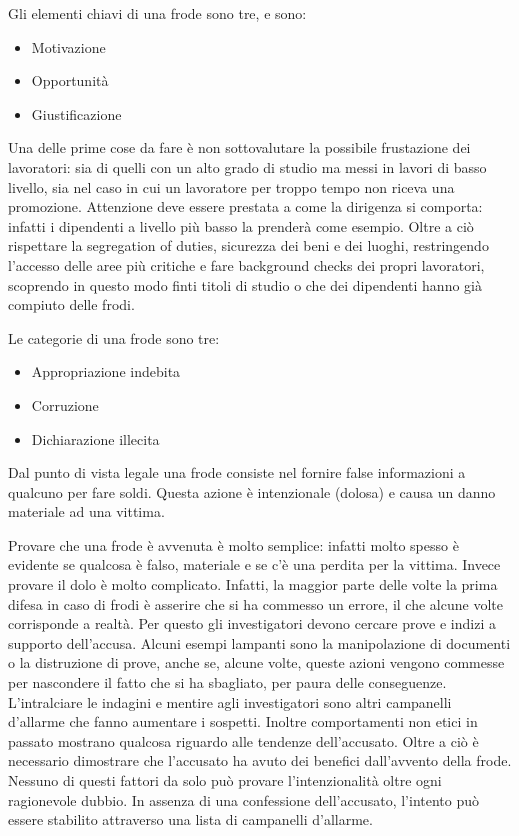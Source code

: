 \begin{Answer} [
  ref={fr7},
  number={7}
 ]

 \Question Gli elementi chiavi di una frode sono tre, e sono:
\begin{itemize}
 \item Motivazione
 \item Opportunità
 \item Giustificazione
\end{itemize}
Una delle prime cose da fare è non sottovalutare la possibile frustazione dei
lavoratori: sia di quelli con un alto grado di studio ma messi in lavori di
basso livello, sia nel caso in cui un lavoratore per troppo tempo non riceva
una promozione. Attenzione deve essere prestata a come la dirigenza si
comporta: infatti i dipendenti a livello più basso la prenderà come esempio.
Oltre a ciò rispettare la segregation of duties, sicurezza dei beni e dei
luoghi, restringendo l'accesso delle aree più critiche e fare background checks
dei propri lavoratori, scoprendo in questo modo finti titoli di studio o che
dei dipendenti hanno già compiuto delle frodi.

 \Question Le categorie di una frode sono tre:
 \begin{itemize}
  \item Appropriazione indebita
  \item Corruzione
  \item Dichiarazione illecita
 \end{itemize}

 \Question 
Dal punto di vista legale una frode consiste nel fornire false informazioni a
qualcuno per fare soldi. Questa azione è intenzionale (dolosa) e causa un danno
materiale ad una vittima. 

Provare che una frode è avvenuta è molto semplice:
infatti molto spesso è evidente se qualcosa è falso, materiale e se c'è una
perdita per la vittima. Invece provare il dolo è molto complicato. Infatti, la
maggior parte delle volte la prima difesa in caso di frodi è asserire che si ha
commesso un errore, il che alcune volte corrisponde a realtà. Per questo gli
investigatori devono cercare prove e indizi a supporto dell'accusa. Alcuni
esempi lampanti sono la manipolazione di documenti o la distruzione di prove,
anche se, alcune volte, queste azioni vengono commesse per nascondere il fatto
che si ha sbagliato, per paura delle conseguenze. L'intralciare le indagini e
mentire agli investigatori sono altri campanelli d'allarme che fanno aumentare
i sospetti. Inoltre comportamenti non etici in passato mostrano qualcosa riguardo alle
tendenze dell'accusato. Oltre a ciò è necessario dimostrare che l'accusato ha avuto
dei benefici dall'avvento della frode. Nessuno di questi fattori da solo può
provare l'intenzionalità oltre ogni ragionevole dubbio. In assenza di una
confessione dell'accusato, l'intento può essere stabilito attraverso una lista
di campanelli d'allarme.


\end{Answer}
